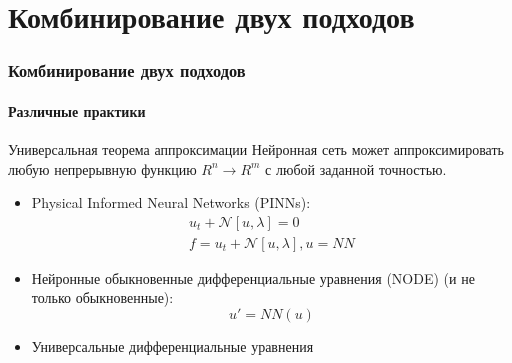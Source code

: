 \documentclass[10pt,pdf,hyperref={unicode}]{beamer}
\begin{document}
			
	\section{Комбинирование двух подходов}
		
		\begin{frame}
			\frametitle{Комбинирование двух подходов} 
			\framesubtitle{Различные практики}
				\begin{block}{Универсальная теорема аппроксимации}
					Нейронная сеть может аппроксимировать любую непрерывную функцию $R^n \to R^m$ с любой заданной точностью.
				\end{block}  
				\begin{itemize}
					\item<2-> Physical Informed Neural Networks (PINNs):
					\begin{displaymath}
					\begin{gathered}
						u_t + \mathcal{N}[u,\lambda] = 0\\
						f = u_t + \mathcal{N}[u,\lambda], u = NN
					\end{gathered}
					\end{displaymath}
					\item<3-> Нейронные обыкновенные дифференциальные уравнения (NODE) (и не только обыкновенные):
					\begin{displaymath}
						u' = NN(u)
					\end{displaymath}
					\item<4-> Универсальные дифференциальные уравнения
				\end{itemize}
		\end{frame}
	
\end{document}
